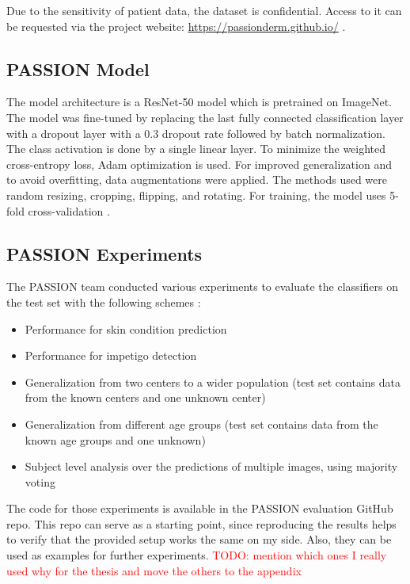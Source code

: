 \documentclass[12pt, a4paper, oneside]{book}   	%
\renewcommand{\todo}[1]{\textcolor{red}{TODO: #1}}
\begin{document}
				
				Due to the sensitivity of patient data, the dataset is confidential. Access to it can be requested via the project website: \href{https://passionderm.github.io/}{https://passionderm.github.io/} \autocite{Gottfrois2024}.
				
			\subsection{PASSION Model}
			  The model architecture is a ResNet-50 model which is pretrained on ImageNet. The model was fine-tuned by replacing the last fully connected classification layer with a dropout layer with a 0.3 dropout rate followed by batch normalization. The class activation is done by a single linear layer. To minimize the weighted cross-entropy loss, Adam optimization is used. For improved generalization and to avoid overfitting, data augmentations were applied. The methods used were random resizing, cropping, flipping, and rotating. For training, the model uses 5-fold cross-validation \textcite{Gottfrois2024}.
			  			
			\subsection{PASSION Experiments}
			  The PASSION team conducted various experiments to evaluate the classifiers on the test set with the following schemes \autocite{Gottfrois2024}:
			  \begin{itemize}
			  	\item Performance for skin condition prediction
			  	\item Performance for impetigo detection
			  	\item Generalization from two centers to a wider population (test set contains data from the known centers and one unknown center)
			  	\item Generalization from different age groups (test set contains data from the known age groups and one unknown)
			  	\item Subject level analysis over the predictions of multiple images, using majority voting
			  \end{itemize}
			  
			  The code for those experiments is available in the PASSION evaluation GitHub repo. This repo can serve as a starting point, since reproducing the results helps to verify that the provided setup works the same on my side. Also, they can be used as examples for further experiments. \todo{mention which ones I really used why for the thesis and move the others to the appendix}
			  
\end{document}
